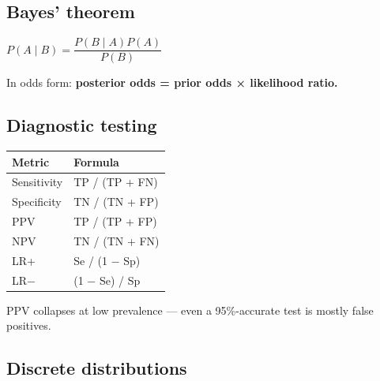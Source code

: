 \documentclass[
]{article}
\newenvironment{Shaded}{\begin{snugshade}}{\end{snugshade}}
\newcommand{\AttributeTok}[1]{\textcolor[rgb]{0.13,0.29,0.53}{#1}}
\newcommand{\DecValTok}[1]{\textcolor[rgb]{0.00,0.00,0.81}{#1}}
\newcommand{\FunctionTok}[1]{\textcolor[rgb]{0.13,0.29,0.53}{\textbf{#1}}}
\newcommand{\NormalTok}[1]{#1}
\newcommand{\SpecialCharTok}[1]{\textcolor[rgb]{0.81,0.36,0.00}{\textbf{#1}}}
\newcounter{none} %
\begin{document}
\begin{Shaded}
\end{Shaded}

\subsection{Bayes' theorem}\label{bayes-theorem}

\(P(A \mid B) = \dfrac{P(B \mid A) P(A)}{P(B)}\)

In odds form: \textbf{posterior odds = prior odds × likelihood ratio.}

\subsection{Diagnostic testing}\label{diagnostic-testing}

{\def\LTcaptype{none} %
\begin{longtable}[]{@{}ll@{}}
\toprule\noalign{}
Metric & Formula \\
\midrule\noalign{}
\endhead
\bottomrule\noalign{}
\endlastfoot
Sensitivity & TP / (TP + FN) \\
Specificity & TN / (TN + FP) \\
PPV & TP / (TP + FP) \\
NPV & TN / (TN + FN) \\
LR+ & Se / (1 − Sp) \\
LR− & (1 − Se) / Sp \\
\end{longtable}
}

PPV collapses at low prevalence --- even a 95\%-accurate test is mostly
false positives.

\subsection{Discrete distributions}\label{discrete-distributions}
\end{document}
